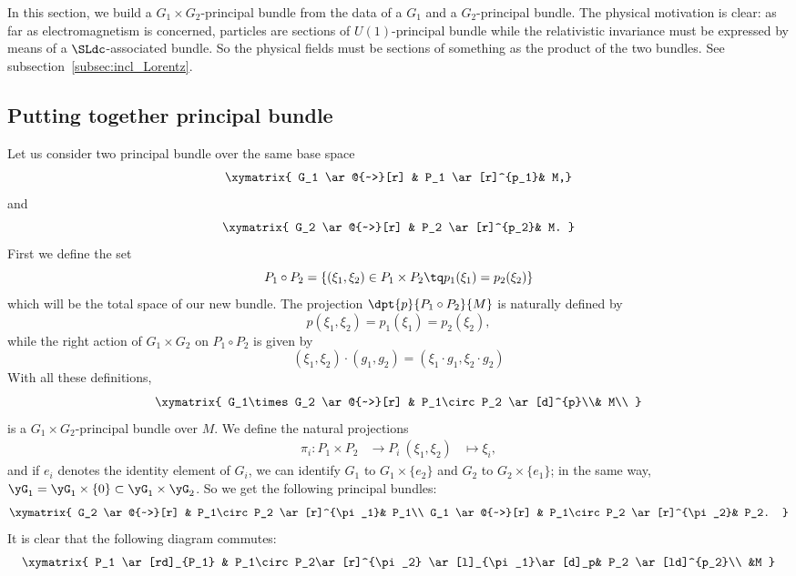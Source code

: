 In this section, we build a $G_1\times G_2$-principal bundle from the data of a $G_1$ and a $G_2$-principal bundle. The physical motivation is clear: as far as electromagnetism is concerned, particles are sections of $U(1)$-principal bundle while the relativistic invariance must be expressed by means of a $\SLdc$-associated bundle. So the physical fields must be sections of something as the product of the two bundles. See subsection~\ref{subsec:incl_Lorentz}.

\subsection{Putting together principal bundle}

Let us consider two principal bundle over the same base space
\[
	\xymatrix{
		G_1  \ar@{~>}[r] & P_1 \ar[r]^{p_1}& M,}
\]
and
\[
	\xymatrix{
		G_2  \ar@{~>}[r] & P_2 \ar[r]^{p_2}& M.
	}
\]
First we define the set
\begin{equation}
	P_1\circ P_2=\{   (\xi_1,\xi_2)\in P_1\times P_2\tq p_1(\xi_1)=p_2(\xi_2)    \}
\end{equation}
which will be the total space of our new bundle. The projection $\dpt{p}{P_1\circ P_2}{M}$ is naturally defined by
\[
	p(\xi_1,\xi_2)=p_1(\xi_1)=p_2(\xi_2),
\]
while the right action of $G_1\times G_2$ on $P_1\circ P_2$ is given by
\[
	(\xi_1,\xi_2)\cdot(g_1,g_2)=(\xi_1\cdot g_1,\xi_2\cdot g_2)
\]
With all these definitions,
\[
	\xymatrix{
		G_1\times G_2  \ar@{~>}[r] & P_1\circ P_2 \ar[d]^{p}\\& M\\
	}
\]
is a $G_1\times G_2$-principal bundle over $M$. We define the natural projections
\begin{equation}
	\begin{aligned}
		\pi_i \colon P_1\times P_2 & \to P_i\
		(\xi_1, \xi_2)             & \mapsto \xi_i,
	\end{aligned}
\end{equation}
%
and if $e_i$ denotes the identity element of $G_i$, we can identify $G_1$ to $G_1\times \{e_2\}$ and $G_2$ to $G_2\times \{e_1\}$; in the same way, $\yG_1=\yG_1\times\{0\}\subset\yG_1\times\yG_2$. So we get the following principal bundles:
\[
	\xymatrix{
		G_2  \ar@{~>}[r] & P_1\circ P_2 \ar[r]^{\pi_1}& P_1\\
		G_1  \ar@{~>}[r] & P_1\circ P_2 \ar[r]^{\pi_2}& P_2.
	}
\]
It is clear that the following diagram commutes:
\[
	\xymatrix{
		P_1  \ar[rd]_{P_1} & P_1\circ P_2\ar[r]^{\pi_2} \ar[l]_{\pi_1}\ar[d]_p& P_2 \ar[ld]^{p_2}\\
		&M
	}
\]

